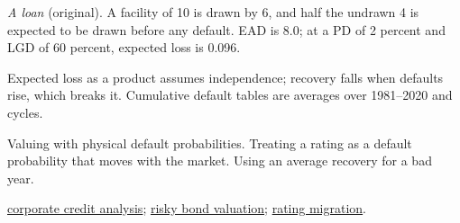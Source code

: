 \begin{qfdefinition}
\emph{A loan} (original). A facility of 10 is drawn by 6, and half the undrawn 4 is expected to be drawn before any default. EAD is 8.0; at a PD of 2 percent and LGD of 60 percent, expected loss is 0.096.

 Expected loss as a product assumes independence; recovery falls when defaults rise, which breaks it. Cumulative default tables are averages over 1981--2020 and cycles.

 Valuing with physical default probabilities. Treating a rating as a default probability that moves with the market. Using an average recovery for a bad year.

 \hyperref[meth:corporate-credit-analysis]{corporate credit analysis}; \hyperref[meth:risky-bond-cva]{risky bond valuation}; \hyperref[meth:rating-migration-returns]{rating migration}.

\end{qfdefinition}


